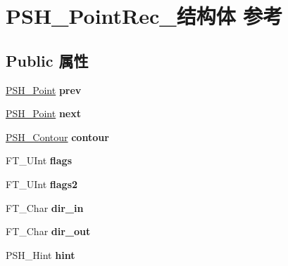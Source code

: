 \hypertarget{struct_p_s_h___point_rec__}{}\section{P\+S\+H\+\_\+\+Point\+Rec\+\_\+结构体 参考}
\label{struct_p_s_h___point_rec__}
\subsection*{Public 属性}
\begin{DoxyCompactItemize}
\item 
\mbox{\label{struct_p_s_h___point_rec___a4bcea810dd0a31e9a2ecf6a9a9f1f54e}} 
\hyperlink{struct_p_s_h___point_rec__}{P\+S\+H\+\_\+\+Point} {\bfseries prev}
\item 
\mbox{\label{struct_p_s_h___point_rec___a9e5fdea59770272ca2ad1d7738f151b1}} 
\hyperlink{struct_p_s_h___point_rec__}{P\+S\+H\+\_\+\+Point} {\bfseries next}
\item 
\mbox{\label{struct_p_s_h___point_rec___aabab25d215eb72dfbf660a1dc34638da}} 
\hyperlink{struct_p_s_h___contour_rec__}{P\+S\+H\+\_\+\+Contour} {\bfseries contour}
\item 
\mbox{\label{struct_p_s_h___point_rec___a4e8ff007cec28131544b2ab18d31dece}} 
F\+T\+\_\+\+U\+Int {\bfseries flags}
\item 
\mbox{\label{struct_p_s_h___point_rec___ab71eb24a6073342c50e6dd891e4f8af4}} 
F\+T\+\_\+\+U\+Int {\bfseries flags2}
\item 
\mbox{\label{struct_p_s_h___point_rec___a9ec38c3873255a735244ca2c1d1312a5}} 
F\+T\+\_\+\+Char {\bfseries dir\+\_\+in}
\item 
\mbox{\label{struct_p_s_h___point_rec___a52bd7db9cde5975efb5ddca68fd4329d}} 
F\+T\+\_\+\+Char {\bfseries dir\+\_\+out}
\item 
\mbox{\label{struct_p_s_h___point_rec___a1dc99602e87f3fa14ac6af2d2ba040f4}} 
P\+S\+H\+\_\+\+Hint {\bfseries hint}

\end{DoxyCompactItemize}

